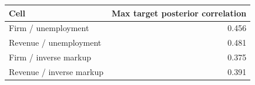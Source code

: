 \begin{tabular}{@{}lr@{}}
\toprule
Cell & Max target posterior correlation \\
\midrule
Firm / unemployment & 0.456 \\
Revenue / unemployment & 0.481 \\
Firm / inverse markup & 0.375 \\
Revenue / inverse markup & 0.391 \\
\bottomrule
\end{tabular}
